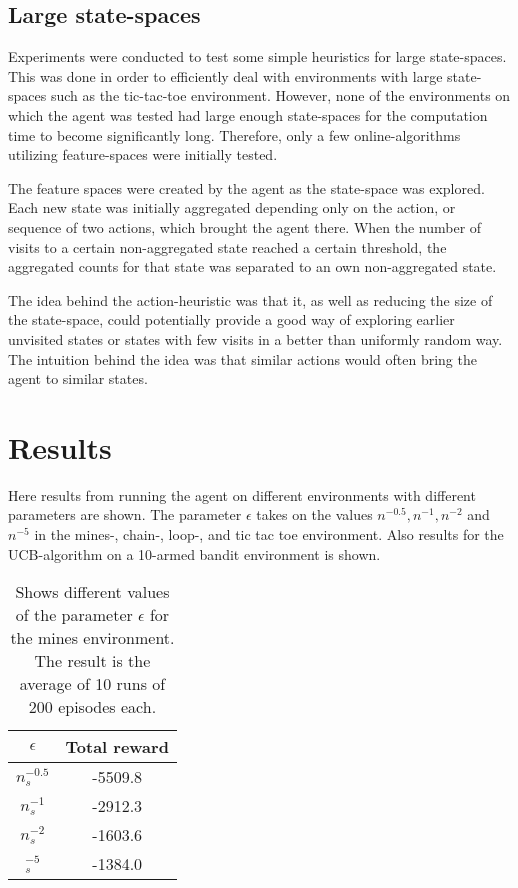 \documentclass[11pt]{article}
\numberwithin{equation}{section}
\begin{document}
\begin{flushleft}
\subsection{Large state-spaces}

Experiments were conducted to test some simple heuristics for large state-spaces. This was done in order to efficiently deal with environments with large state-spaces such as the tic-tac-toe environment. However, none of the environments on which the agent was tested had large enough state-spaces for the computation time to become significantly long. Therefore, only a few online-algorithms utilizing feature-spaces were initially tested. \newline

The feature spaces were created by the agent as the state-space was explored. Each new state was initially aggregated depending only on the action, or sequence of two actions, which brought the agent there. When the number of visits to a certain non-aggregated state reached a certain threshold, the aggregated counts for that state was separated to an own non-aggregated state. \newline

The idea behind the action-heuristic was that it, as well as reducing the size of the state-space, could potentially provide a good way of exploring earlier unvisited states or states with few visits in a better than uniformly random way. The intuition behind the idea was that similar actions would often bring the agent to similar states.

\section{Results}

Here results from running the agent on different environments with different parameters are shown. The parameter $\epsilon$ takes on the values $n^{-0.5},n^{-1},n^{-2}$ and $n^{-5}$ in the mines-, chain-, loop-, and tic tac toe environment. Also results for the UCB-algorithm on a 10-armed bandit environment is shown.

\begin{table}[H]
\caption{Shows different values of the parameter $\epsilon$ for the mines environment. The result is the average of 10 runs of 200 episodes each.}
\begin{center}
\begin{tabular}{|c|c|}
\hline
$\epsilon$ & Total reward \\ \hline
$n_s^{-0.5}$ & -5509.8 \\ \hline
$n_s^{-1}$ & -2912.3 \\ \hline
$n_s^{-2}$ & -1603.6 \\ \hline
$_s^{-5}$ & -1384.0 \\
\hline
\end{tabular}
\label{tab:minesMean}
\end{center}
\end{table}


\end{flushleft}
\end{document}
